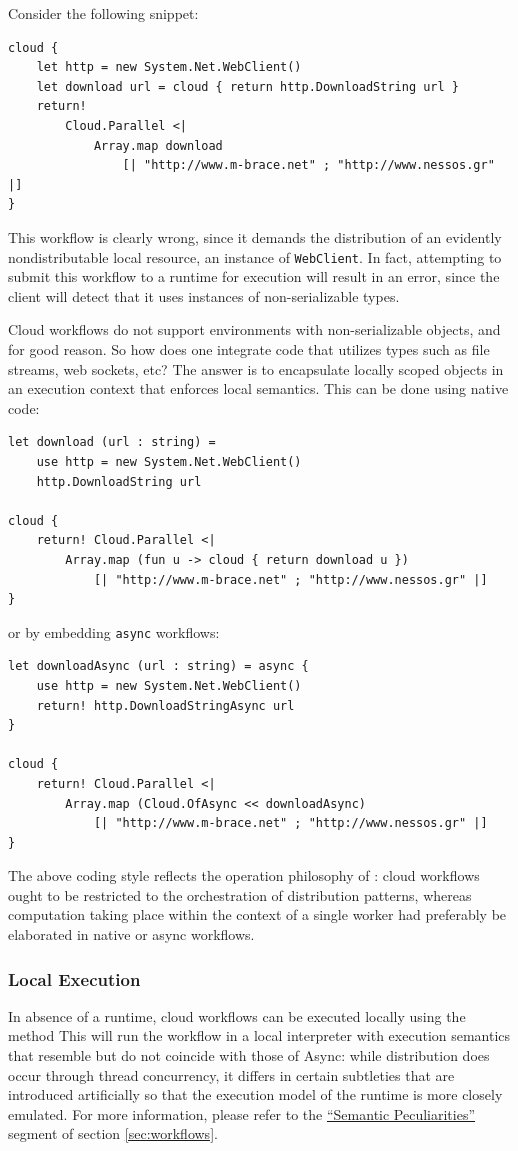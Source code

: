\noindent Consider the following snippet:
\begin{lstlisting}
cloud {
	let http = new System.Net.WebClient()
	let download url = cloud { return http.DownloadString url }
	return! 
		Cloud.Parallel <| 
			Array.map download 
				[| "http://www.m-brace.net" ; "http://www.nessos.gr" |]
}
\end{lstlisting}
This workflow is clearly wrong, since it demands the distribution of an evidently
nondistributable local resource, an instance of \texttt{WebClient}.
In fact, attempting to submit this workflow to a runtime for execution will result in
an error, since the client will detect that it uses instances of non-serializable 
types.

Cloud workflows do not support environments with non-serializable objects,
and for good reason. So how does one integrate code that utilizes types such
as file streams, web sockets, etc?
%
The answer is to encapsulate locally scoped objects in an execution context
that enforces local semantics. This can be done using native \fsharp{} code:
\begin{lstlisting}
let download (url : string) =
	use http = new System.Net.WebClient()
	http.DownloadString url

cloud {
	return! Cloud.Parallel <|
		Array.map (fun u -> cloud { return download u })
			[| "http://www.m-brace.net" ; "http://www.nessos.gr" |]
}
\end{lstlisting}
or by embedding \texttt{async} workflows:
\begin{lstlisting}
let downloadAsync (url : string) = async {
	use http = new System.Net.WebClient()
	return! http.DownloadStringAsync url
}

cloud {
	return! Cloud.Parallel <|
		Array.map (Cloud.OfAsync << downloadAsync)
			[| "http://www.m-brace.net" ; "http://www.nessos.gr" |]
} 
\end{lstlisting}

The above coding style reflects the operation philosophy of \mbrace:
cloud workflows ought to be restricted to the orchestration of distribution patterns, 
whereas computation taking place within the context of a single worker 
had preferably be elaborated in native \dotnet{} or async workflows.

\subsubsection*{Local Execution}

In absence of a runtime, cloud workflows can be executed locally using the method
%
%
This will run the workflow in a local interpreter with execution semantics that resemble
but do not coincide with those of Async: while distribution does occur through thread 
concurrency, it differs in certain subtleties that are introduced artificially so that 
the execution model of the \mbrace{} runtime is more closely emulated.
For more information, please refer to the \href{peculiarities}{``Semantic Peculiarities''}
segment of section \ref{sec:workflows}.

